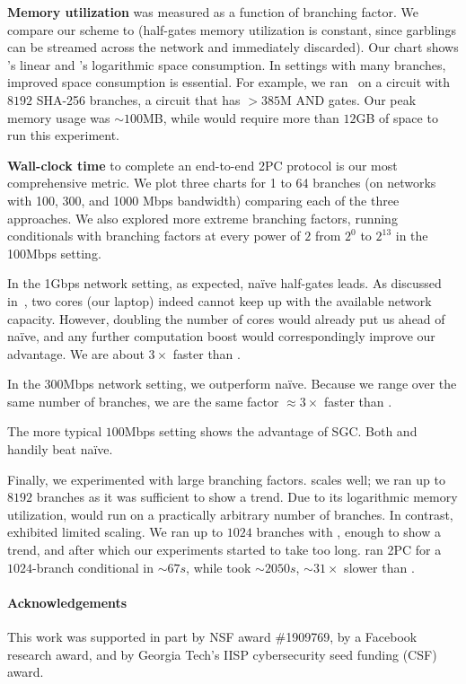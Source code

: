 \textbf{Memory utilization} was measured as a function of branching
factor.
We compare our scheme to \stack (half-gates memory utilization is
constant, since garblings
can be streamed across the network and immediately discarded).
%
Our chart shows \stack's linear and
\ourschemelong's logarithmic space consumption.
In settings with many branches, improved space consumption
is essential.
For example, we ran \ourschemelong\ on a circuit
with $8192$ SHA-256 branches, a circuit that has $> 385$M
AND gates.  Our peak memory usage was $\sim 100$MB, while \HK
would require more than $12$GB of space to run this experiment.

\textbf{Wall-clock time} to complete an end-to-end 2PC
protocol is our most comprehensive metric.
We plot three charts for 1 to 64
branches (on networks with 100, 300, and 1000 Mbps bandwidth) comparing each of the three approaches.
We also explored more extreme branching factors, running conditionals with
branching factors at every power of $2$ from $2^0$ to $2^{13}$ in the 100Mbps setting.

In the 1Gbps network setting, as expected, na\"ive half-gates leads.
As discussed in~, two cores (our laptop) indeed
cannot keep up with the available network capacity.  However, doubling
the number of cores would already put us ahead of na\"ive, and any
further computation boost would correspondingly improve
our advantage.  We are about $3\times$ faster than \stack.

In the 300Mbps network setting, we outperform na\"ive.  Because we
range over the same number of branches, we are the same
factor $\approx 3\times$ faster than \stack.

The more typical $100$Mbps setting shows the advantage of SGC.
Both \stack and \ourschemelong handily beat na\"ive.

Finally, we experimented with large branching factors.
\ourschemelong scales well; we ran up to $8192$ branches as it
was sufficient to show a trend.  Due to its logarithmic memory
utilization, \ourschemelong would run on a practically
arbitrary number of branches.  In contrast, \stack exhibited limited
scaling.  We ran up to $1024$ branches with
\stack, enough to show a trend, and after which our experiments
started to take too long.   \ourschemelong ran 2PC for a
$1024$-branch conditional in $\sim 67s$, while \stack took $\sim
2050s$,  $\sim 31\times$ slower than \ourschemelong.

\paragraph{Acknowledgements}
This work was supported in part by NSF award  \#1909769,  by a Facebook  research  award, and by Georgia  Tech’s IISP cybersecurity seed funding (CSF) award.


